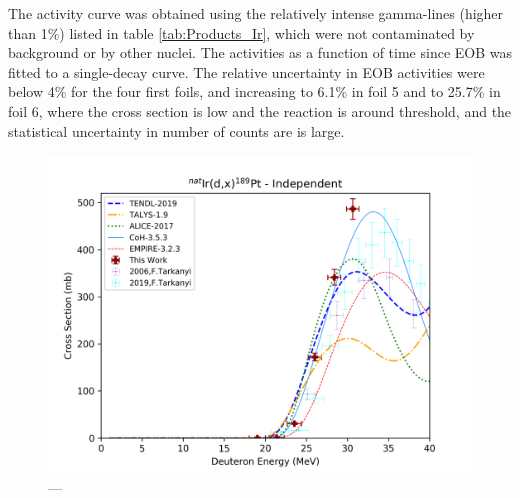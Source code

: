 The activity curve was obtained using the relatively intense gamma-lines (higher than 1\%) listed in table \ref{tab:Products_Ir}, which were not contaminated by background or by other nuclei. The activities as a function of time since EOB was fitted to a single-decay curve. The relative uncertainty in EOB activities were below 4\% for the four first foils, and increasing to 6.1\% in foil 5 and to 25.7\% in foil 6, where the cross section is low and the reaction is around threshold, and the statistical uncertainty in number of counts are is large.   

\begin{figure}
    \centering
    \includegraphics{Results/Ir_189Pt.png}
    \caption{---}
    \label{fig:189Pt}
\end{figure}




